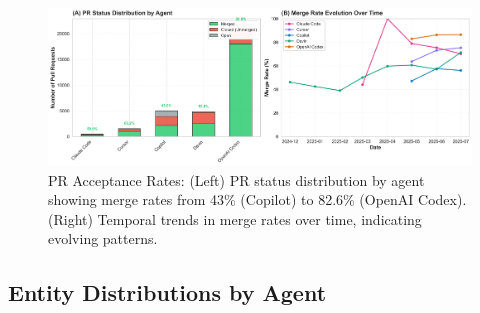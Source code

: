 \documentclass[11pt]{article}
\begin{document}
\begin{figure}[H]
\centering
\includegraphics[width=\textwidth]{figures/fig2_pr_acceptance_rates.png}
\caption{PR Acceptance Rates: (Left) PR status distribution by agent showing merge rates from 43\% (Copilot) to 82.6\% (OpenAI Codex). (Right) Temporal trends in merge rates over time, indicating evolving patterns.}
\label{fig:pr_acceptance}
\end{figure}

\subsection{Entity Distributions by Agent}
\end{document}
